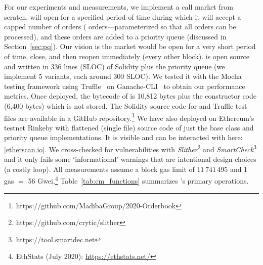 For our experiments and measurements, we implement a call market from scratch. \cm will open for a specified period of time during which it will accept a capped number of orders ( orders---parameterized so that all orders can be processed), and these orders are added to a priority queue (discussed in Section~\ref{sec:pq}). Our vision is the market would be open for a very short period of time, close, and then reopen immediately (\eg every other block). \cm is open source and written in 336 lines (SLOC) of Solidity plus the priority queue (\eg we implement 5 variants, each around 300 SLOC). We tested it with the Mocha testing framework using Truffle~\cite{TruffleO71:online} on Ganache-CLI~\cite{GanacheT25:online} to obtain our performance metrics. Once deployed, the bytecode of \cm is 10,812 bytes plus the constructor code (6,400 bytes) which is not stored. The Solidity source code for \cm and Truffle test files are available in a GitHub repository.\footnote{https://github.com/MadibaGroup/2020-Orderbook} We have also deployed \cm on Ethereum's testnet Rinkeby with flattened (single file) source code of just the \cm base class and priority queue implementations. It is visible and can be interacted with here: \href{https://rinkeby.etherscan.io/address/0x0d91de29c531d074853a5cef7cf9dfeb9c6ec4e0}{[etherscan.io]}. We cross-checked for vulnerabilities with \textit{Slither}\footnote{https://github.com/crytic/slither} and \textit{SmartCheck}\footnote{https://tool.smartdec.net} and it only fails some `informational' warnings that are intentional design choices (\eg a costly loop). All measurements assume a block gas limit of $11\,741\,495$ and 1 gas $=$ 56 Gwei.\footnote{EthStats (July 2020): \url{https://ethstats.net/}} Table~\ref{tab:cm_functions} summarizes \cm's primary operations.\



%
%


